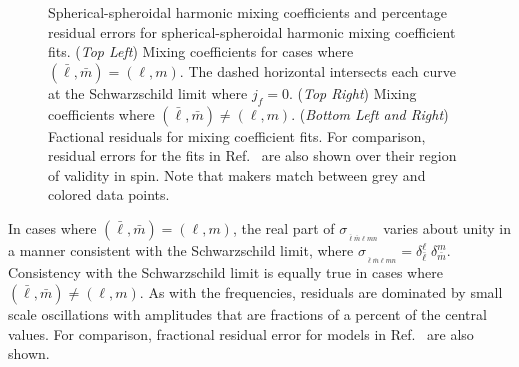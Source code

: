 \documentclass[twocolumn,aps,prd,floatfix,preprintnumbers,a4paper,nofootinbib,
superscriptaddress,10pt]{revtex4-1}
\def\jf{j_f}
\def\LMlmn{_{\bar{\ell} \bar{m} \ell m n}}
\begin{document}
\begin{figure}[htb]
\begin{tabular}{ll}
  \end{tabular}
	\caption{ Spherical-spheroidal harmonic mixing coefficients and percentage residual errors for spherical-spheroidal harmonic mixing coefficient fits. (\textit{Top Left}) Mixing coefficients for cases where $(\bar{\ell},\bar{m})=(\ell,m)$. The dashed horizontal intersects each curve at the Schwarzschild limit where $\jf=0$. (\textit{Top Right}) Mixing coefficients where $(\bar{\ell},\bar{m})\neq(\ell,m)$. (\textit{Bottom Left and Right}) Factional residuals for mixing coefficient fits. For comparison, residual errors for the fits in Ref.~\cite{Berti:2014fga} are also shown over their region of validity in \bh{} spin. Note that makers match between grey and colored data points. }
  \label{fig:ys}
\end{figure}
%
In cases where $(\bar\ell,\bar{m})=(\ell,m)$, the real part of $\sigma_{\LMlmn}$ varies about unity in a manner consistent with the Schwarzschild limit, where $\sigma_{\LMlmn}=\delta_{\bar\ell}^{\ell}\;\delta_{\bar{m}}^{m}$.
%
Consistency with the Schwarzschild limit is equally true in cases where $(\bar\ell,\bar{m}) \neq (\ell,m)$.
%
As with the \qnm{} frequencies, residuals are dominated by small scale oscillations with amplitudes that are fractions of a percent of the central values.
%
For comparison, fractional residual error for models in Ref.~\cite{Berti:2014fga} are also shown.
%
\end{document}
